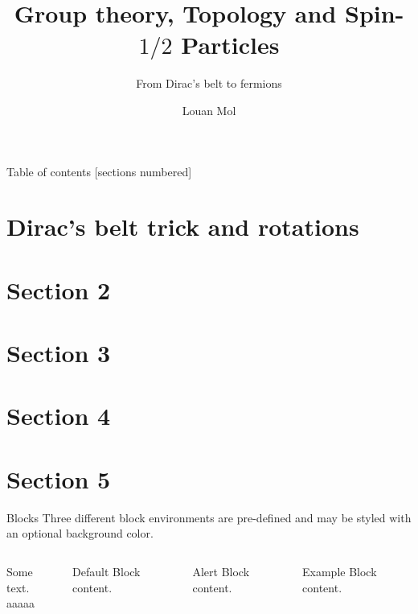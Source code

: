 \documentclass[10pt]{beamer}
\title{Group theory, Topology and Spin-$1/2$ Particles}
\subtitle{From Dirac's belt to fermions}
\date{}
\author{Louan Mol}
\institute{Unversité Libre de Bruxelles\\[2cm]{\small Brussels Summer School of Mathematics 2022}}
\begin{document}
\maketitle

\begin{frame}{Table of contents}
  [sections numbered]
  \tableofcontents%
\end{frame}

\section[Intro]{Dirac's belt trick and rotations}

\section{Section 2}

\section{Section 3}

\section{Section 4}

\section{Section 5}

\begin{frame}{Blocks}
    Three different block environments are pre-defined and may be styled with an
    optional background color.
  
    \begin{columns}[T,onlytextwidth]
          
            Some text.\\[2cm]
            aaaaa
    
    
          \begin{block}{Default}
            Block content.
          \end{block}
    
          \begin{alertblock}{Alert}
            Block content.
          \end{alertblock}
    
          \begin{exampleblock}{Example}
            Block content.
          \end{exampleblock}
    
      \end{columns}

  \end{frame}
\end{document}
